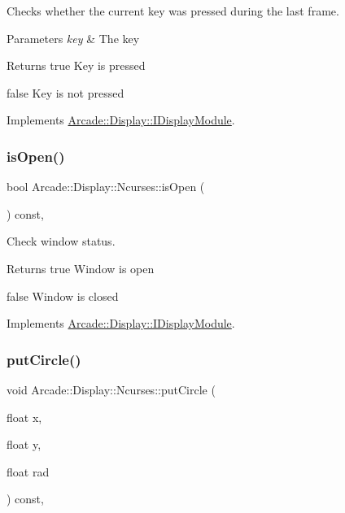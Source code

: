 Checks whether the current key was pressed during the last frame. 


\begin{DoxyParams}{Parameters}
{\em key} & The key \\
\hline
\end{DoxyParams}
\begin{DoxyReturn}{Returns}
true Key is pressed 

false Key is not pressed 
\end{DoxyReturn}


Implements \mbox{\hyperlink{classArcade_1_1Display_1_1IDisplayModule_a531b700b332e077d9b714bafac05ebe1}{Arcade\+::\+Display\+::\+I\+Display\+Module}}.

\mbox{\label{classArcade_1_1Display_1_1Ncurses_a57f8a7c485cba89aa6862c2b84e442c0}} 
\subsubsection{\texorpdfstring{isOpen()}{isOpen()}}
{\footnotesize\ttfamily bool Arcade\+::\+Display\+::\+Ncurses\+::is\+Open (\begin{DoxyParamCaption}{ }\end{DoxyParamCaption}) const\hspace{0.3cm}{\ttfamily [final]}, {\ttfamily [virtual]}}



Check window status. 

\begin{DoxyReturn}{Returns}
true Window is open 

false Window is closed 
\end{DoxyReturn}


Implements \mbox{\hyperlink{classArcade_1_1Display_1_1IDisplayModule_a34c86dd2e7aa60a70c0cc06ccbd34e47}{Arcade\+::\+Display\+::\+I\+Display\+Module}}.

\mbox{\label{classArcade_1_1Display_1_1Ncurses_a06da271e2ab3e6e188965471ce46bf32}} 
\subsubsection{\texorpdfstring{putCircle()}{putCircle()}}
{\footnotesize\ttfamily void Arcade\+::\+Display\+::\+Ncurses\+::put\+Circle (\begin{DoxyParamCaption}\item[{float}]{x,  }\item[{float}]{y,  }\item[{float}]{rad }\end{DoxyParamCaption}) const\hspace{0.3cm}{\ttfamily [final]}, {\ttfamily [virtual]}}



